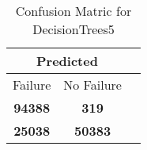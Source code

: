 \begin{table}[] 
\caption{Confusion Matric for DecisionTrees5} 
\label{Table: Prediction Accuracy-DMDDecisionTrees5OnlySunEKF-ignoreReflectionEKF-top2perfectNoFailurePrediction-Reflection} 
\centering 
\begin{tabular} 
 {@{}ccc@{}} 
\toprule 
\multicolumn{2}{c}{\textbf{Predicted}}
 \\ \midrule 
\multicolumn{1}{|c|}{Failure} & 
\multicolumn{1}{c|}{No Failure}
 \\ \midrule 
\multicolumn{1}{|c|}{\color{green}\textbf{94388}} & 
\multicolumn{1}{c|}{\color{red}\textbf{319}}
 \\ \midrule 
\multicolumn{1}{|c|}{\color{red}\textbf{25038}} & 
\multicolumn{1}{c|}{\color{green}\textbf{50383}}
 \\ \bottomrule 
\end{tabular} 
\end{table} 
